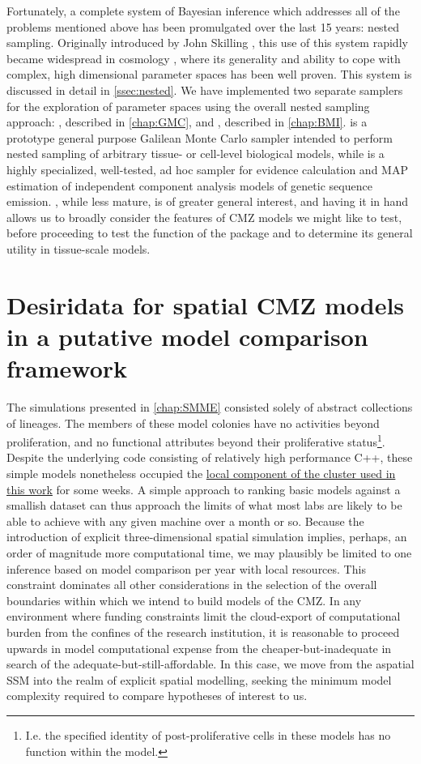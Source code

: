 Fortunately, a complete system of Bayesian inference which addresses all of the problems mentioned above has been promulgated over the last 15 years: nested sampling. Originally introduced by John Skilling \cite{Skilling2006}, this use of this system rapidly became widespread in cosmology \cite{Trotta2008,Feroz2009,Higson2019}, where its generality and ability to cope with complex, high dimensional parameter spaces has been well proven. This system is discussed in detail in \autoref{ssec:nested}. We have implemented two separate samplers for the exploration of parameter spaces using the overall nested sampling approach: , described in \autoref{chap:GMC}, and , described in \autoref{chap:BMI}.  is a prototype general purpose Galilean Monte Carlo sampler intended to perform nested sampling of arbitrary tissue- or cell-level biological models, while  is a highly specialized, well-tested, ad hoc sampler for evidence calculation and MAP estimation of independent component analysis models of genetic sequence emission. , while less mature, is of greater general interest, and having it in hand allows us to broadly consider the features of CMZ models we might like to test, before proceeding to test the function of the package and to determine its general utility in tissue-scale models.

\section{Desiridata for spatial CMZ models in a putative model comparison framework}
The simulations presented in \autoref{chap:SMME} consisted solely of abstract collections of lineages. The members of these model colonies have no activities beyond proliferation, and no functional attributes beyond their proliferative status\footnote{I.e. the specified identity of post-proliferative cells in these models has no function within the model.}. Despite the underlying code consisting of relatively high performance C++, these simple models nonetheless occupied the \hyperref[cluster]{local component of the cluster used in this work} for some weeks. A simple approach to ranking basic models against a smallish dataset can thus approach the limits of what most labs are likely to be able to achieve with any given machine over a month or so. Because the introduction of explicit three-dimensional spatial simulation implies, perhaps, an order of magnitude more computational time, we may plausibly be limited to one inference based on model comparison per year with local resources. This constraint dominates all other considerations in the selection of the overall boundaries within which we intend to build models of the CMZ. In any environment where funding constraints limit the cloud-export of computational burden from the confines of the research institution, it is reasonable to proceed upwards in model computational expense from the cheaper-but-inadequate in search of the adequate-but-still-affordable. In this case, we move from the aspatial SSM into the realm of explicit spatial modelling, seeking the minimum model complexity required to compare hypotheses of interest to us.

